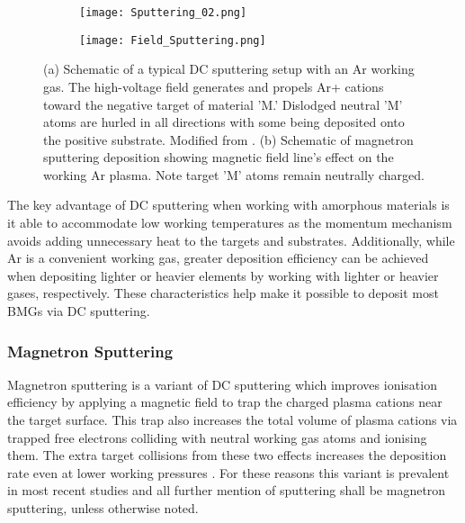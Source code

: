 \documentclass[a4paper,12pt,oneside]{report}%
\begin{document}
\begin{figure}[bp]
	\centering
	\begin{subfigure}[htbp]{0.75\textwidth}
		\texttt{[image: Sputtering\_02.png]}
		\caption{}
		\label{fig:Sputter_Schematic}
	\end{subfigure}
	\begin{subfigure}[htbp]{0.75\textwidth}
		\texttt{[image: Field\_Sputtering.png]}
		\caption{}
		\label{fig:Field_Sputtering}
	\end{subfigure}
	\caption{(a) Schematic of a typical DC sputtering setup with an Ar working gas. The high-voltage field generates and propels Ar+ cations toward the negative target of material 'M.' Dislodged neutral 'M' atoms are hurled in all directions with some being deposited onto the positive substrate. Modified from \cite{Brown2014}. (b) Schematic of magnetron sputtering deposition showing magnetic field line's effect on the working Ar plasma. Note target 'M' atoms remain neutrally charged.}%
	\label{fig:Sputter}
\end{figure}

The key advantage of DC sputtering when working with amorphous materials is it able to accommodate low working temperatures as the momentum mechanism avoids adding unnecessary heat to the targets and substrates. Additionally, while Ar is a convenient working gas, greater deposition efficiency can be achieved when depositing lighter or heavier elements by working with lighter or heavier gases, respectively. These characteristics help make it possible to deposit most BMGs via DC sputtering.  

\subsubsection{Magnetron Sputtering}
Magnetron sputtering is a variant of DC sputtering which improves ionisation efficiency by applying a magnetic field to trap the charged plasma cations near the target surface. This trap also increases the total volume of plasma cations via trapped free electrons colliding with neutral working gas atoms and ionising them. The extra target collisions from these two effects increases the deposition rate even at lower working pressures . For these reasons this variant is prevalent in most recent studies and all further mention of sputtering shall be magnetron sputtering, unless otherwise noted. 
\end{document}
